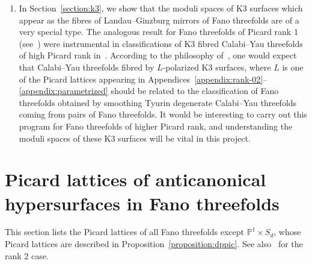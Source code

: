 \documentclass[10pt]{amsart}
\numberwithin{equation}{section}
\theoremstyle{plain}
\theoremstyle{definition}
\theoremstyle{remark}
\begin{document}
\begin{enumerate}[(1)]
\item In Section~\ref{section:k3}, we show that the moduli spaces of K3 surfaces which appear as the fibres of Landau--Ginzburg mirrors of Fano threefolds are of a very special type. The analogous result for  Fano threefolds of Picard rank 1 (see~\cite{golyshev2004modularity,golyshev2007classification}) were instrumental in classifications of K3 fibred Calabi--Yau threefolds of high Picard rank in~\cite{doran2020calabi}. According to the philosophy of~\cite{doran2017mirror}, one would expect that Calabi--Yau threefolds fibred by \(L\)-polarized K3 surfaces, where \(L\) is one of the Picard lattices appearing in Appendices~\ref{appendix:rank-02}--\ref{appendix:parametrized} should be related to the classification of Fano threefolds obtained by smoothing Tyurin degenerate Calabi--Yau threefolds coming from pairs of Fano threefolds. It would be interesting to carry out this program for Fano threefolds of higher Picard rank, and understanding the moduli spaces of these K3 surfaces will be vital in this project.
\end{enumerate}


\appendix

\section{Picard lattices of anticanonical hypersurfaces in Fano threefolds}\label{appendix:picard-lattices-fano}

This section lists the Picard lattices of all Fano threefolds except \(\mathbb{P}^1 \times S_d\), whose Picard lattices are described in Proposition~\ref{proposition:dppic}. See also~\cite{mase2014families} for the rank 2 case.
\end{document}
